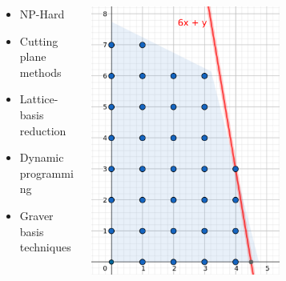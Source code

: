 \documentclass{beamer}
\begin{document}
\begin{frame}
        \begin{columns}[T] %
        \begin{column}{.48\textwidth}
        \begin{itemize}
            \item NP-Hard
            \item Cutting plane methods
            \item Lattice-basis reduction
            \item Dynamic programming
            \item \alert{Graver basis} techniques
        \end{itemize}
        \end{column}%
        \hfill%
        \begin{column}{.48\textwidth}
            \includegraphics[width=0.6\textwidth]{images/IP(2).png}
        \end{column}%
        \end{columns}
    
        
        
    \end{frame}
    
\end{document}
